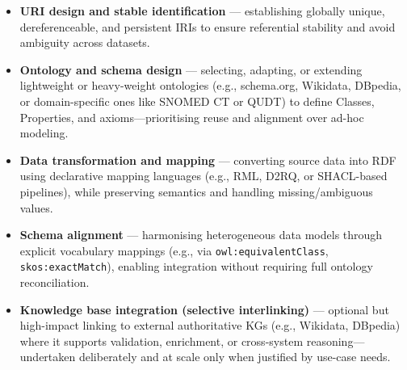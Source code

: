 \begin{itemize}
\item \textbf{URI design and stable identification} — establishing globally unique, dereferenceable, and persistent IRIs to ensure referential stability and avoid ambiguity across datasets.
\item \textbf{Ontology and schema design} — selecting, adapting, or extending lightweight or heavy-weight ontologies (e.g., schema.org, Wikidata, DBpedia, or domain-specific ones like SNOMED CT or QUDT) to define Classes, Properties, and axioms—prioritising reuse and alignment over ad-hoc modeling.
\item \textbf{Data transformation and mapping} — converting source data into RDF using declarative mapping languages (e.g., RML, D2RQ, or SHACL-based pipelines), while preserving semantics and handling missing/ambiguous values.
\item \textbf{Schema alignment} — harmonising heterogeneous data models through explicit vocabulary mappings (e.g., via \texttt{owl:equivalentClass}, \texttt{skos:exactMatch}), enabling integration without requiring full ontology reconciliation.
\item \textbf{Knowledge base integration (selective interlinking)} — optional but high-impact linking to external authoritative KGs (e.g., Wikidata, DBpedia) where it supports validation, enrichment, or cross-system reasoning— undertaken deliberately and at scale only when justified by use-case needs.
\end{itemize}





